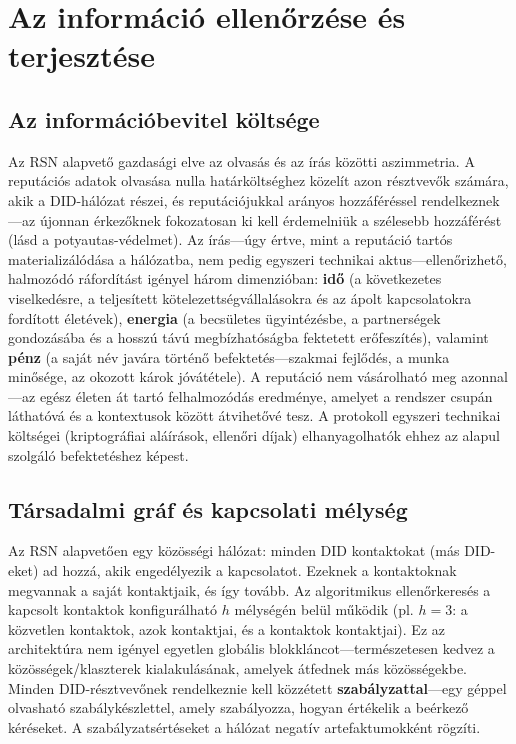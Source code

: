 \documentclass[11pt,a4paper,twocolumn]{article}
\begin{document}
\section{Az információ ellenőrzése és terjesztése}

\subsection{Az információbevitel költsége}

Az RSN alapvető gazdasági elve az olvasás és az írás közötti aszimmetria. A reputációs adatok olvasása nulla határköltséghez közelít azon résztvevők számára, akik a DID-hálózat részei, és reputációjukkal arányos hozzáféréssel rendelkeznek---az újonnan érkezőknek fokozatosan ki kell érdemelniük a szélesebb hozzáférést (lásd a potyautas-védelmet). Az írás---úgy értve, mint a reputáció tartós materializálódása a hálózatba, nem pedig egyszeri technikai aktus---ellenőrizhető, halmozódó ráfordítást igényel három dimenzióban: \textbf{idő} (a következetes viselkedésre, a teljesített kötelezettségvállalásokra és az ápolt kapcsolatokra fordított életévek), \textbf{energia} (a becsületes ügyintézésbe, a partnerségek gondozásába és a hosszú távú megbízhatóságba fektetett erőfeszítés), valamint \textbf{pénz} (a saját név javára történő befektetés---szakmai fejlődés, a munka minősége, az okozott károk jóvátétele). A reputáció nem vásárolható meg azonnal---az egész életen át tartó felhalmozódás eredménye, amelyet a rendszer csupán láthatóvá és a kontextusok között átvihetővé tesz. A protokoll egyszeri technikai költségei (kriptográfiai aláírások, ellenőri díjak) elhanyagolhatók ehhez az alapul szolgáló befektetéshez képest.

\subsection{Társadalmi gráf és kapcsolati mélység}

Az RSN alapvetően egy közösségi hálózat: minden DID kontaktokat (más DID-eket) ad hozzá, akik engedélyezik a kapcsolatot. Ezeknek a kontaktoknak megvannak a saját kontaktjaik, és így tovább. Az algoritmikus ellenőrkeresés a kapcsolt kontaktok konfigurálható $h$ mélységén belül működik (pl. $h=3$: a közvetlen kontaktok, azok kontaktjai, és a kontaktok kontaktjai). Ez az architektúra nem igényel egyetlen globális blokkláncot---természetesen kedvez a közösségek/klaszterek kialakulásának, amelyek átfednek más közösségekbe. Minden DID-résztvevőnek rendelkeznie kell közzétett \textbf{szabályzattal}---egy géppel olvasható szabálykészlettel, amely szabályozza, hogyan értékelik a beérkező kéréseket. A szabályzatsértéseket a hálózat negatív artefaktumokként rögzíti.
\end{document}
